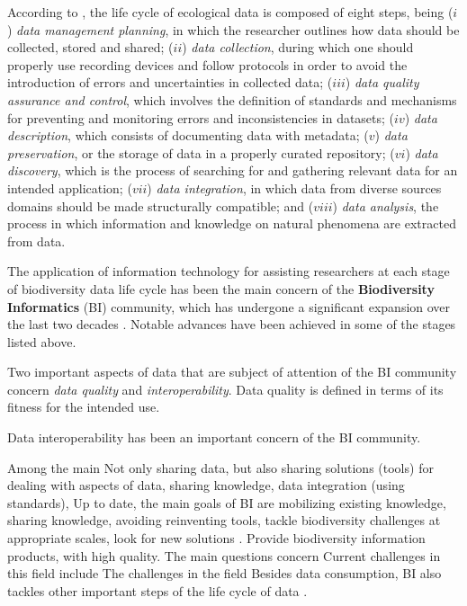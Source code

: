 According to , the life cycle of ecological data is composed of eight steps, being 
($i$) \textit{data management planning}, in which the researcher outlines how data should be collected, stored and shared;
($ii$) \textit{data collection}, during which one should properly use recording devices and follow protocols in order to avoid the introduction of errors and uncertainties in collected data;
($iii$) \textit{data quality assurance and control}, which involves the definition of standards and mechanisms for preventing and monitoring errors and inconsistencies in datasets;
($iv$) \textit{data description}, which consists of documenting data with metadata;
($v$) \textit{data preservation}, or the storage of data in a properly curated repository;
($vi$) \textit{data discovery}, which is the process of searching for and gathering relevant data for an intended application;
($vii$) \textit{data integration}, in which data from diverse sources domains should be made structurally compatible; and
($viii$) \textit{data analysis}, the process in which information and knowledge on natural phenomena are extracted from data.

The application of information technology for assisting researchers at each stage of biodiversity data life cycle has been the main concern of the \textbf{Biodiversity Informatics} (BI) community, which has undergone a significant expansion over the last two decades \cite{Soberon2004,Peterson2015}.
Notable advances have been achieved in some of the stages listed above.


Two important aspects of data that are subject of attention of the BI community concern \textit{data quality} and \textit{interoperability}.
Data quality is defined in terms of its fitness for the intended use.

Data interoperability has been an important concern of the BI community.


 

%
Among the main 	
Not only sharing data, but also sharing solutions (tools) for dealing with aspects of data, sharing knowledge, data integration (using standards), 
Up to date, the main goals of BI are
mobilizing existing knowledge, sharing knowledge, avoiding reinventing tools, tackle biodiversity challenges at appropriate scales, look for new solutions \cite{Peterson2015}.
%
Provide biodiversity information products, with high quality.
The main questions concern 
Current challenges in this field include 
The challenges in the field 
Besides data consumption, BI also tackles other important steps of the life cycle of data \cite{Michener2012}.

